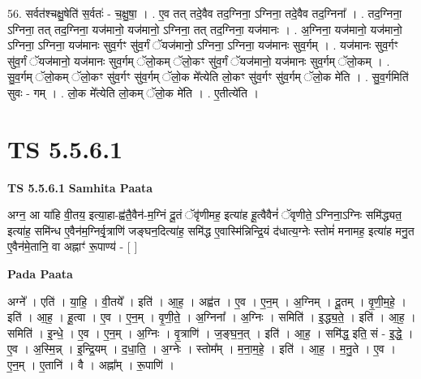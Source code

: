 \documentclass[17pt]{extarticle}
\begin{document}
56. सर्वत॑श्चक्षु॒षेति॑ स॒र्वतः॑ - च॒क्षु॒षा॒ । . ए॒व तत् तदे॒वैव तद॒ग्निना॒ ऽग्निना॒ तदे॒वैव तद॒ग्निना᳚ । . तद॒ग्निना॒ ऽग्निना॒ तत् तद॒ग्निना॒ यज॑मानो॒ यज॑मानो॒ ऽग्निना॒ तत् तद॒ग्निना॒ यज॑मानः । . अ॒ग्निना॒ यज॑मानो॒ यज॑मानो॒ ऽग्निना॒ ऽग्निना॒ यज॑मानः सुव॒र्गꣳ सु॑व॒र्गं ॅयज॑मानो॒ ऽग्निना॒ ऽग्निना॒ यज॑मानः सुव॒र्गम् । . यज॑मानः सुव॒र्गꣳ सु॑व॒र्गं ॅयज॑मानो॒ यज॑मानः सुव॒र्गम् ॅलो॒कम् ॅलो॒कꣳ सु॑व॒र्गं ॅयज॑मानो॒ यज॑मानः सुव॒र्गम् ॅलो॒कम् । . सु॒व॒र्गम् ॅलो॒कम् ॅलो॒कꣳ सु॑व॒र्गꣳ सु॑व॒र्गम् ॅलो॒क मे᳚त्येति लो॒कꣳ सु॑व॒र्गꣳ सु॑व॒र्गम् ॅलो॒क मे॑ति । . सु॒व॒र्गमिति॑ सुवः - गम् । . लो॒क मे᳚त्येति लो॒कम् ॅलो॒क मे॑ति । . ए॒तीत्ये॑ति । \newline
\pagebreak
{}

\section{ TS 5.5.6.1 }

\textbf{TS 5.5.6.1 } \newline
\textbf{Samhita Paata} \newline

अग्न॒ आ या॑हि वी॒तय॒ इत्या॒हा-ह्व॑तै॒वैन॑-म॒ग्निं दू॒तं ॅवृ॑णीमह॒ इत्या॑ह हू॒त्वैवैनं॑ ॅवृणीते॒ ऽग्निना॒ऽग्निः समि॑द्ध्यत॒ इत्या॑ह॒ समि॑न्ध ए॒वैन॑म॒ग्निर्वृ॒त्राणि॑ जङ्घन॒दित्या॑ह॒ समि॑द्ध ए॒वास्मि॑न्निन्द्रि॒यं द॑धात्य॒ग्नेः स्तोमं॑ मनामह॒ इत्या॑ह मनु॒त ए॒वैन॑मे॒तानि॒ वा अह्नाꣳ॑ रू॒पाण्य॑ - [  ] \newline

\textbf{Pada Paata} \newline

अग्ने᳚ । एति॑ । या॒हि॒ । वी॒तये᳚ । इति॑ । आ॒ह॒ । अह्व॑त । ए॒व । ए॒न॒म् । अ॒ग्निम् । दू॒तम् । वृ॒णी॒म॒हे॒ । इति॑ । आ॒ह॒ । हू॒त्वा । ए॒व । ए॒न॒म् । वृ॒णी॒ते॒ । अ॒ग्निना᳚ । अ॒ग्निः । समिति॑ । इ॒द्ध्य॒ते॒ । इति॑ । आ॒ह॒ । समिति॑ । इ॒न्धे॒ । ए॒व । ए॒न॒म् । अ॒ग्निः । वृ॒त्राणि॑ । ज॒ङ्घ॒न॒त् । इति॑ । आ॒ह॒ । समि॑द्ध॒ इति॒ सं - इ॒द्धे॒ । ए॒व । अ॒स्मि॒न्न् । इ॒न्द्रि॒यम् । द॒धा॒ति॒ । अ॒ग्नेः । स्तोम᳚म् । म॒ना॒म॒हे॒ । इति॑ । आ॒ह॒ । म॒नु॒ते । ए॒व । ए॒न॒म् । ए॒तानि॑ । वै । अह्ना᳚म् । रू॒पाणि॑ ।  \newline
\end{document}
